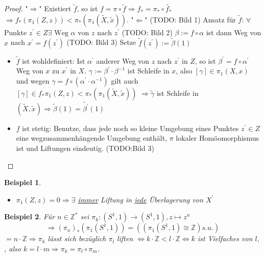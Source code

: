 \documentclass[a4paper,11pt,notitlepage]{report}
\newtheorem{example}{Beispiel}[chapter]
\theoremstyle{definition}
\newcommand{\Z}{{\ensuremath{\mathbb{Z}}}}
\begin{document}
\begin{proof}
	"$\Rightarrow$" Existiert $\widetilde{f}$, so ist $f = \pi \circ \widetilde{f} \Rightarrow f_* = \pi_* \circ \widetilde{f_*}$
	\newline
	$\Rightarrow f_*(\pi_1(Z,z)) < \pi_*(\pi_1(\widetilde{X},\widetilde{x}))$.
	\newline
	"$\Leftarrow$" (TODO: Bild 1) Ansatz für $\widetilde{f}$:
	\newline
	$\forall$ Punkte $z^\prime \in Z \exists \text{ Weg } \alpha \text{ von } z \text{ nach } z^\prime$ (TODO: Bild 2)
	\newline
	$\beta := f \circ \alpha$ ist dann Weg von $x$ nach $x^\prime = f(z^\prime)$ (TODO: Bild 3)
	\newline
	Setze $\widetilde{f}(z^\prime) := \widetilde{\beta}(1)$
	\begin{itemize}
	\item $\widetilde{f}$ ist wohldefiniert: Ist $\alpha^\prime$ anderer Weg von $z$ nach $z^\prime$ in $Z$, so ist $\beta^\prime = f \circ \alpha^\prime$ Weg von $x$ zu $x^\prime$ in $X$.
	\newline
	$\gamma := \beta^\prime \cdot \beta^{-1}$ ist Schleife in $x$, also $[\gamma] \in \pi_1(X,x)$ und wegen $\gamma = f \circ (\alpha^\prime \cdot \alpha^{-1})$ gilt auch $[\gamma] \in f_* \pi_1(Z,z) < \pi_*(\pi_1(\widetilde{X},\widetilde{x}))$
	\newline
	$\Rightarrow \widetilde{\gamma}$ ist Schleife in $(\widetilde{X}, \widetilde{x}) \Rightarrow \widetilde{\beta}(1) = \widetilde{\beta^\prime}(1)$
	\item $f$ ist stetig: Benutze, dass jede noch so kleine Umgebung eines Punktes $z^\prime \in Z$ eine wegzusammenhängende Umgebung enthält, $\pi$ lokaler Homöomorphismus ist und Liftungen eindeutig. (TODO:Bild 3)
	\end{itemize}
\end{proof}

\begin{example}
	\begin{itemize}
		\item $\pi_1(Z,z) = 0 \Rightarrow \exists$ \underline{immer} Liftung in \underline{jede} Überlagerung von $X^\prime$
	\end{itemize}
\end{example}

\begin{example}
	Für $n \in \Z^*$ sei $\pi_k \colon (S^1,1) \rightarrow (S^1,1), z \mapsto z^n$
	$$\Rightarrow (\pi_n)_* (\pi_1(S^1,1)) = ((\pi_1(S^1,1) \cong \Z) s.u.)$$
	$=n \cdot \Z \Rightarrow \pi_k$ lässt sich bezüglich $\pi_l$ liften $\Leftrightarrow k \cdot \Z < l \cdot \Z \Leftrightarrow k$ ist Vielfaches von $l,$, also $k = l \cdot m \Rightarrow \pi_k = \pi_l \circ \pi_m$.	
\end{example}
\end{document}

